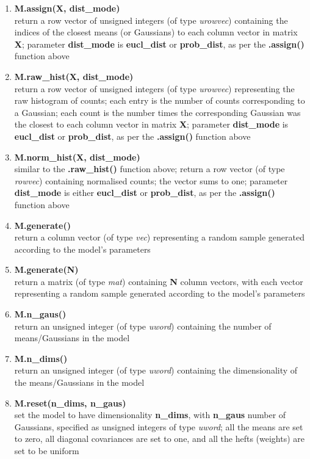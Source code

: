 \begin{enumerate}[{$\bullet$}]
\item
{\bf M.assign(X, dist\_mode)}\\
return a row vector of unsigned integers (of type {\it urowvec}) containing the indices of the closest means (or Gaussians) to each column vector in matrix {\bf X};
parameter {\bf dist\_mode} is {\bf eucl\_dist} or {\bf prob\_dist}, as per the {\bf .assign()} function above

\item
{\bf M.raw\_hist(X, dist\_mode)}\\
return a row vector of unsigned integers (of type {\it urowvec}) representing the raw histogram of counts;
each entry is the number of counts corresponding to a Gaussian;
each count is the number times the corresponding Gaussian was the closest to each column vector in matrix {\bf X};
parameter {\bf dist\_mode} is {\bf eucl\_dist} or {\bf prob\_dist}, as per the {\bf .assign()} function above

\item
{\bf M.norm\_hist(X, dist\_mode)}\\
similar to the {\bf .raw\_hist()} function above; return a row vector (of type {\it rowvec}) containing normalised counts; the vector sums to one;
parameter {\bf dist\_mode} is either {\bf eucl\_dist} or {\bf prob\_dist}, as per the {\bf .assign()} function above

\item
{\bf M.generate()}\\
return a column vector (of type {\it vec}) representing a random sample generated according to the model's parameters

\item
{\bf M.generate(N)}\\
return a matrix (of type {\it mat}) containing {\bf N} column vectors, with each vector representing a random sample generated according to the model's parameters

\item
{\bf M.n\_gaus()}\\
return an unsigned integer (of type {\it uword}) containing the number of means/Gaussians in the model

\item
{\bf M.n\_dims()}\\
return an unsigned integer (of type {\it uword}) containing the dimensionality of the means/Gaussians in the model

\item
{\bf M.reset(n\_dims, n\_gaus)}\\
set the model to have dimensionality {\bf n\_dims}, with {\bf n\_gaus} number of Gaussians, specified as unsigned integers of type {\it uword};
all the means are set to zero, all diagonal covariances are set to one, and all the hefts (weights) are set to be uniform


\end{enumerate}
